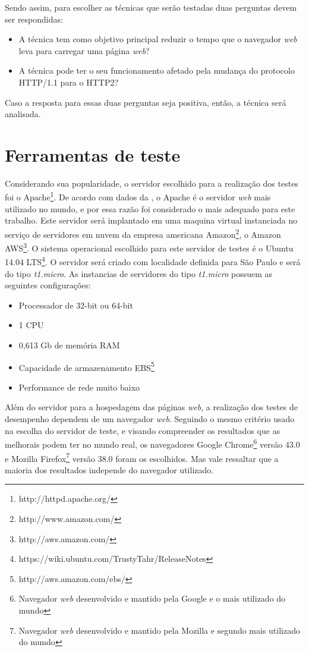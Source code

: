 Sendo assim, para escolher as técnicas que serão testadas duas perguntas devem ser respondidas:

\begin{itemize}
	\item A técnica tem como objetivo principal reduzir o tempo que o navegador \textit{web} leva para carregar uma página \textit{web}?
	\item A técnica pode ter o seu funcionamento afetado pela mudança do protocolo HTTP/1.1 para o HTTP2?
\end{itemize}

Caso a resposta para essas duas perguntas seja positiva, então, a técnica será analisada.

\section{Ferramentas de teste}

Considerando sua popularidade, o servidor escolhido para a realização dos testes foi o Apache\footnote{http://httpd.apache.org/}. De acordo com dados da , o Apache é o servidor \textit{web} mais utilizado no mundo, e por essa razão foi considerado o mais adequado para este trabalho. Este servidor será implantado em uma maquina virtual instanciada no serviço de servidores em nuvem da empresa americana Amazon\footnote{http://www.amazon.com/}, o Amazon AWS\footnote{http://aws.amazon.com/}. O sistema operacional escolhido para este servidor de testes é o Ubuntu 14.04 LTS\footnote{https://wiki.ubuntu.com/TrustyTahr/ReleaseNotes}. O servidor será criado com localidade definida para São Paulo e será do tipo \textit{t1.micro}. As instancias de servidores do tipo \textit{t1.micro} possuem as seguintes configurações:

\begin{itemize}
	\item Processador de 32-bit ou 64-bit
	\item 1 CPU
	\item 0,613 Gb de memória RAM
	\item Capacidade de armazenamento EBS\footnote{http://aws.amazon.com/ebs/}
	\item Performance de rede muito baixo
\end{itemize}

Além do servidor para a hospedagem das páginas \textit{web}, a realização dos testes de desempenho dependem de um navegador \textit{web}. Seguindo o mesmo critério usado na escolha do servidor de teste, e visando compreender os resultados que as melhorais podem ter no mundo real, os navegadores Google Chrome\footnote{Navegador \textit{web} desenvolvido e mantido pela Google e o mais utilizado do mundo} versão 43.0 e Mozilla Firefox\footnote{Navegador \textit{web} desenvolvido e mantido pela Mozilla e segundo mais utilizado do mundo} versão 38.0 foram os escolhidos. Mas vale ressaltar que a maioria dos resultados independe do navegador utilizado.

